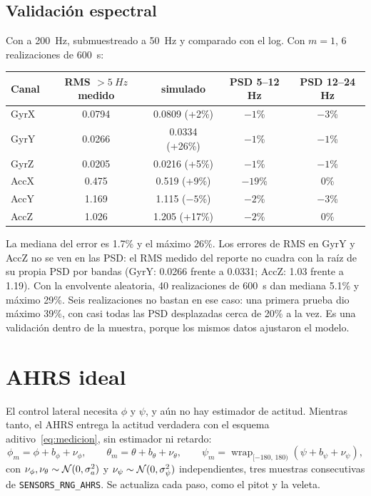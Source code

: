 \documentclass[11pt,a4paper]{article}
\begin{document}
\subsection{Validación espectral}

Con  a \SI{200}{Hz}, submuestreado a \SI{50}{Hz} y
comparado con el log. Con $m=1$, 6 realizaciones de \SI{600}{s}:

\begin{center}
\begin{tabular}{lcc@{\hskip 1.5em}cc}
\toprule
Canal & RMS $>\SI{5}{Hz}$ medido & simulado & PSD 5--12 Hz & PSD 12--24 Hz \\
\midrule
GyrX & 0.0794 & 0.0809 (+2\%)  & $-1$\%  & $-3$\% \\
GyrY & 0.0266 & 0.0334 (+26\%) & $-1$\%  & $-1$\% \\
GyrZ & 0.0205 & 0.0216 (+5\%)  & $-1$\%  & $-1$\% \\
AccX & 0.475  & 0.519 (+9\%)   & $-19$\% & 0\%    \\
AccY & 1.169  & 1.115 ($-5$\%) & $-2$\%  & $-3$\% \\
AccZ & 1.026  & 1.205 (+17\%)  & $-2$\%  & 0\%    \\
\bottomrule
\end{tabular}
\end{center}

La mediana del error es 1.7\% y el máximo 26\%. Los errores de RMS en GyrY y AccZ no
se ven en las PSD: el RMS medido del reporte no cuadra con la raíz de su propia PSD
por bandas (GyrY: 0.0266 frente a 0.0331; AccZ: 1.03 frente a 1.19). Con la
envolvente aleatoria, 40 realizaciones de \SI{600}{s} dan mediana 5.1\% y máximo
29\%. Seis realizaciones no bastan en ese caso: una primera prueba dio máximo 39\%,
con casi todas las PSD desplazadas cerca de 20\% a la vez. Es una validación dentro de la muestra,
porque los mismos datos ajustaron el modelo.

\section{AHRS ideal}
\label{sec:ahrs}

El control lateral necesita $\phi$ y $\psi$, y aún no hay estimador de actitud.
Mientras tanto, el AHRS entrega la actitud verdadera con el esquema
aditivo~\eqref{eq:medicion}, sin estimador ni retardo:
\begin{equation}
  \phi_m = \phi + b_\phi + \nu_\phi, \qquad
  \theta_m = \theta + b_\theta + \nu_\theta, \qquad
  \psi_m = \operatorname{wrap}_{[-180,\,180)}(\psi + b_\psi + \nu_\psi),
\end{equation}
con $\nu_\phi, \nu_\theta \sim \mathcal{N}(0, \sigma_a^2)$ y
$\nu_\psi \sim \mathcal{N}(0, \sigma_\psi^2)$ independientes, tres muestras
consecutivas de \texttt{SENSORS\_RNG\_AHRS}. Se actualiza cada paso, como el
pitot y la veleta.
\end{document}
